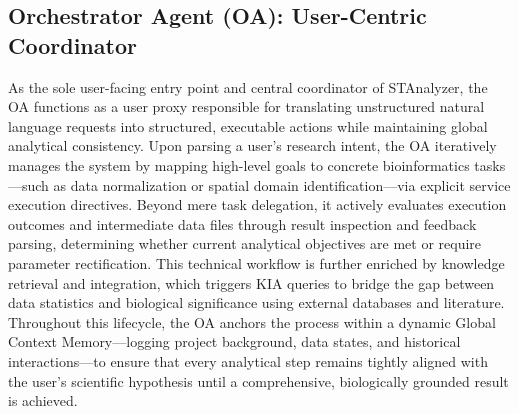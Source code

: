 \documentclass[a4,center,fleqn]{NAR}
\begin{document}
\subsection{Orchestrator Agent (OA): User-Centric Coordinator}
As the sole user-facing entry point and central coordinator of STAnalyzer, the OA functions as a user proxy responsible for translating unstructured natural language requests into structured, executable actions while maintaining global analytical consistency. Upon parsing a user’s research intent, the OA iteratively manages the system by mapping high-level goals to concrete bioinformatics tasks—such as data normalization or spatial domain identification—via explicit service execution directives. Beyond mere task delegation, it actively evaluates execution outcomes and intermediate data files through result inspection and feedback parsing, determining whether current analytical objectives are met or require parameter rectification. This technical workflow is further enriched by knowledge retrieval and integration, which triggers KIA queries to bridge the gap between data statistics and biological significance using external databases and literature. Throughout this lifecycle, the OA anchors the process within a dynamic Global Context Memory—logging project background, data states, and historical interactions—to ensure that every analytical step remains tightly aligned with the user’s scientific hypothesis until a comprehensive, biologically grounded result is achieved.

    
\end{document}
